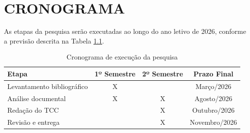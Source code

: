 \chapter{CRONOGRAMA}

As etapas da pesquisa serão executadas ao longo do ano letivo de 2026, conforme a previsão descrita na Tabela \ref{tab:cronograma}.

\begin{table}[H]
    \centering
    \caption{Cronograma de execução da pesquisa}
    \label{tab:cronograma}
    \begin{tabular}{|l|c|c|c|}
        \hline
        \textbf{Etapa} & \textbf{1º Semestre} & \textbf{2º Semestre} & \textbf{Prazo Final} \\
        \hline
        Levantamento bibliográfico & X & & Março/2026 \\
        \hline
        Análise documental & X & X & Agosto/2026 \\
        \hline
        Redação do TCC & & X & Outubro/2026 \\
        \hline
        Revisão e entrega & & X & Novembro/2026 \\
        \hline
    \end{tabular}
\end{table}